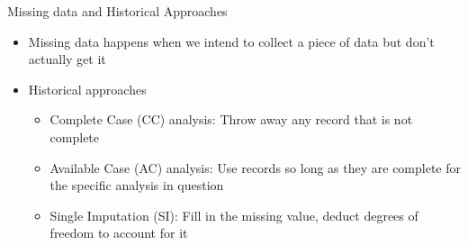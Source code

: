\begin{frame}{Missing data and Historical Approaches}
 \begin{itemize}
 \item Missing data happens when we intend to collect a piece of data but don't actually get it
 \item Historical approaches
 \begin{itemize}
  \item Complete Case (CC) analysis: Throw away any record that is not complete
 \item Available Case (AC) analysis: Use records so long as they are complete for the specific analysis in question
 \item Single Imputation (SI): Fill in the missing value, deduct degrees of freedom to account for it
 \end{itemize}
 \end{itemize}
 
\end{frame}

